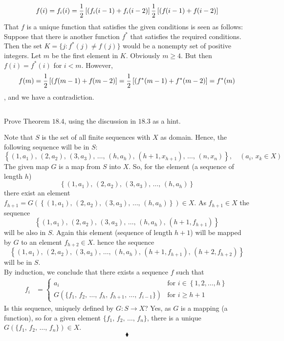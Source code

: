 $$ f(i)=f_i(i)= \frac{1}{2}\left[(f_{i}(i-1)+ f_{i}(i-2)\right]\frac{1}{2}\left[(f_{}(i-1)+ f_{}(i-2)\right]$$ 
That $f$ is a unique function that satisfies the given conditions is seen as follows: Suppose that there is another function $f^{*}$ that satisfies the required conditions. Then the set $K =\{j:f^{*}(j)\ne f^{}(j)\}$ would be a nonempty set of positive integers. Let $m$ be the first element in $K$. Obviously $m\ge 4$. But then $f(i) = f^{*}(i)$ for $i < m$. However, $$f(m) = \frac{1}{2}\left[(f_{}(m-1)+ f_{}(m-2)\right]= \frac{1}{2}\left[(f^{*}(m-1)+ f^{*}(m-2)\right]=f^{*}(m)$$, and we have a contradiction. 
\newpage
\subsection{}
\begin{tcolorbox}
Prove Theorem $\mathbf{18.4}$, using the discussion in $\mathbf{18.3}$ as a hint. 
\end{tcolorbox}
$$ $$
Note that $S$ is the set of all finite sequences with $X$ as domain. Hence, the following sequence will be in $S$:
$$\left\{ (1,a_1),\, (2,a_2),\, (3,a_3),\, \dots ,\,(h,a_h),\,(h+1,x_{h+1}),\,\dots,\, (n,x_n)\right\},\quad (a_i,\, x_k \in X)$$ 
The given map $G$ is a map from $S$ into $X$. So, for the element (a sequence of length $h$) 
$$\left\{ (1,a_1),\, (2,a_2),\, (3,a_3),\, \dots ,\,(h,a_h)\right\}$$ there exist an element $f_{h+1}=G\left(\left\{ (1,a_1),\, (2,a_2),\, (3,a_3),\, \dots ,\,(h,a_h)\right\}\right)\in X$. As $f_{h+1}\in X$ the sequence 
$$\left\{ (1,a_1),\, (2,a_2),\, (3,a_3),\, \dots ,\,(h,a_h),\,(h+1,f_{h+1})\right\}$$
will be also in $S$. Again this element (sequence of length $h+1$) will be mapped by $G$ to an element $f_{h+2}\in X$. hence the sequence
$$\left\{ (1,a_1),\, (2,a_2),\, (3,a_3),\, \dots ,\,(h,a_h),\,(h+1,f_{h+1}),\,(h+2,f_{h+2})\right\}$$
will be in $S$.\\
By induction, we conclude that there exists a sequence $f$ such that
\begin{align*}
f_i&= \left\{
\begin{array}{ll}
a_i& \text{for } i\in \left\{1,2,\dots, h\right\}\\
G\left(\{f_1,\,f_2,\,\dots ,\, f_h,\, f_{h+1},\,\dots,\, f_{i-1}\}\right) & \text{for } i\ge h+1
\end{array}
\right.
\end{align*}
Is this sequence, uniquely defined by $G:S\rightarrow X$? Yes, as $G$ is a mapping (a function), so for a given element $\{f_1,\,f_2,\,\dots ,\, f_n\}$, there is a unique $G\left(\{f_1,\,f_2,\,\dots ,\, f_n\}\right)\in X$.
$$\blacklozenge$$
